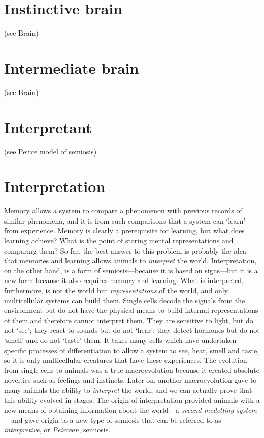 \documentclass[12pt]{article}
\begin{document}
\section{Instinctive brain} (see Brain)


\section{Intermediate brain} (see Brain)


\section{Interpretant} (see \hyperlink{peirce_model_of_semiosis}{Peirce model of semiosis})


\section{Interpretation}
Memory allows a system to compare a phenomenon with previous records of similar phenomena, and it is from such comparisons that a system can `learn' from experience. Memory is clearly a prerequisite for learning, but what does learning achieve? What is the point of storing mental representations and comparing them? So far, the best answer to this problem is probably the idea that memories and learning allows animals to \textit{interpret} the world. Interpretation, on the other hand, is a form of semiosis---because it is based on signs---but it is a new form because it also requires memory and learning. What is interpreted, furthermore, is not the world but \textit{representations} of the world, and only multicellular systems can build them. Single cells decode the signals from the environment but do not have the physical means to build internal representations of them and therefore cannot interpret them. They are sensitive to light, but do not `see'; they react to sounds but do not `hear'; they detect hormones but do not `smell' and do not `taste' them. It takes many cells which have undertaken specific processes of differentiation to allow a system to see, hear, smell and taste, so it is only multicellular creatures that have these experiences. The evolution from single cells to animals was a true macroevolution because it created absolute novelties such as feelings and instincts. Later on, another macroevolution gave to many animals the ability to \textit{interpret} the world, and we can actually prove that this ability evolved in stages. The origin of interpretation provided animals with a new means of obtaining information about the world---a \textit{second modelling system}---and gave origin to a new type of semiosis that can be referred to as \textit{interpretive}, or \textit{Peircean}, semiosis. 
\end{document}
